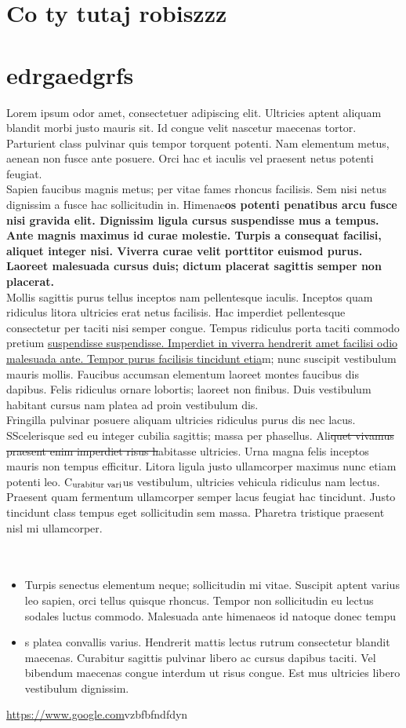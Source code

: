 \documentclass{article}
\begin{document}
\section{\textnormal{Co ty tutaj robiszzz}}
\section{\textnormal{edrgaedgrfs}}
Lorem ipsum odor amet, consectetuer adipiscing elit. Ultricies aptent aliquam blandit morbi justo mauris sit. Id congue velit nascetur maecenas tortor. Parturient class pulvinar quis tempor torquent potenti. Nam elementum metus, aenean non fusce ante posuere. Orci hac et iaculis vel praesent netus potenti feugiat.\\Sapien faucibus magnis metus; per vitae fames rhoncus facilisis. Sem nisi netus dignissim a fusce hac sollicitudin in. Himenae\textbf{os potenti penatibus arcu fusce nisi gravida elit. Dignissim ligula cursus suspendisse mus a tempus. Ante magnis maximus id curae molestie. Turpis a consequat facilisi, aliquet integer nisi. Viverra curae velit porttitor euismod purus. Laoreet malesuada cursus duis; dictum placerat sagittis semper non placerat.}\\Mollis sagittis purus tellus inceptos nam pellentesque iaculis. Inceptos quam ridiculus litora ultricies erat netus facilisis. Hac imperdiet pellentesque consectetur per taciti nisi semper congue. Tempus ridiculus porta taciti commodo pretium \uline{suspendisse suspendisse. Imperdiet in viverra hendrerit amet facilisi odio malesuada ante. Tempor purus facilisis tincidunt etia}m; nunc suscipit vestibulum mauris mollis. Faucibus accumsan elementum laoreet montes faucibus dis dapibus. Felis ridiculus ornare lobortis; laoreet non finibus. Duis vestibulum habitant cursus nam platea ad proin vestibulum dis.\\Fringilla pulvinar posuere aliquam ultricies ridiculus purus dis nec lacus. SScelerisque sed eu integer cubilia sagittis; massa per phasellus. Ali\sout{quet vivamus praesent enim imperdiet risus h}abitasse ultricies. Urna magna felis inceptos mauris non tempus efficitur. Litora ligula justo ullamcorper maximus nunc etiam potenti leo. C$_{\textnormal{urabitur vari}}$us vestibulum, ultricies vehicula ridiculus nam lectus. Praesent quam fermentum ullamcorper semper lacus feugiat hac tincidunt. Justo tincidunt class tempus eget sollicitudin sem massa. Pharetra tristique praesent nisl mi ullamcorper.\\\\\\\begin{itemize}\item Turpis senectus elementum neque; sollicitudin mi vitae. Suscipit aptent varius leo sapien, orci tellus quisque rhoncus. Tempor non sollicitudin eu lectus sodales luctus commodo. Malesuada ante himenaeos id natoque donec tempu\item s platea convallis varius. Hendrerit mattis lectus rutrum consectetur blandit maecenas. Curabitur sagittis pulvinar libero ac cursus dapibus taciti. Vel bibendum maecenas congue interdum ut risus congue. Est mus ultricies libero vestibulum dignissim.\end{itemize}
\uline{\url{https://www.google.com}}vzbfbfndfdyn
\end{document}
